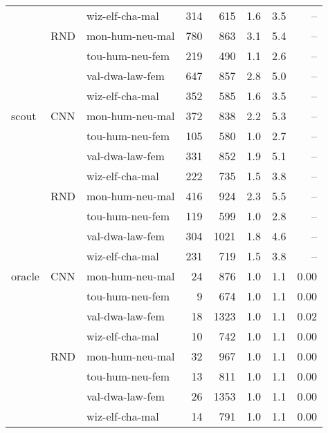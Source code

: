 \documentclass{article}
\begin{document}
\begin{table}[t!]
{\begin{tabular}{lllrrrrr}
      &    &  wiz-elf-cha-mal &    314 &   615 &               1.6 &            3.5 &   -- \\
\cmidrule{2-8}
      &   RND &  mon-hum-neu-mal &    780 &   863 &               3.1 &            5.4 &   -- \\
      &    &  tou-hum-neu-fem &    219 &   490 &               1.1 &            2.6 &   -- \\
      &    &  val-dwa-law-fem &    647 &   857 &               2.8 &            5.0 &   -- \\
      &    &  wiz-elf-cha-mal &    352 &   585 &               1.6 &            3.5 &   -- \\
\midrule
     scout &   CNN &  mon-hum-neu-mal &    372 &   838 &               2.2 &            5.3 &   -- \\
      &    &  tou-hum-neu-fem &    105 &   580 &               1.0 &            2.7 &   -- \\
      &    &  val-dwa-law-fem &    331 &   852 &               1.9 &            5.1 &   -- \\
      &    &  wiz-elf-cha-mal &    222 &   735 &               1.5 &            3.8 &   -- \\
\cmidrule{2-8}
      &   RND &  mon-hum-neu-mal &    416 &   924 &               2.3 &            5.5 &   -- \\
      &    &  tou-hum-neu-fem &    119 &   599 &               1.0 &            2.8 &   -- \\
      &    &  val-dwa-law-fem &    304 &  1021 &               1.8 &            4.6 &   -- \\
      &    &  wiz-elf-cha-mal &    231 &   719 &               1.5 &            3.8 &   -- \\
\midrule
    oracle &   CNN &  mon-hum-neu-mal &     24 &   876 &               1.0 &            1.1 &   0.00 \\
     &    &  tou-hum-neu-fem &      9 &   674 &               1.0 &            1.1 &   0.00 \\
     &    &  val-dwa-law-fem &     18 &  1323 &               1.0 &            1.1 &   0.02 \\
     &    &  wiz-elf-cha-mal &     10 &   742 &               1.0 &            1.1 &   0.00 \\
\cmidrule{2-8}
     &   RND &  mon-hum-neu-mal &     32 &   967 &               1.0 &            1.1 &   0.00 \\
     &    &  tou-hum-neu-fem &     13 &   811 &               1.0 &            1.1 &   0.00 \\
     &    &  val-dwa-law-fem &     26 &  1353 &               1.0 &            1.1 &   0.00 \\
     &    &  wiz-elf-cha-mal &     14 &   791 &               1.0 &            1.1 &   0.00 \\
\bottomrule
\end{tabular}
}
\label{tab:results:score}
\end{table}
\end{document}
